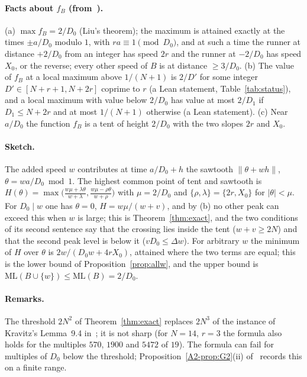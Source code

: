 \documentclass[11pt]{article}
\theoremstyle{definition}
\theoremstyle{remark}
\newcommand{\nd}[1]{\lVert #1\rVert}
\newcommand{\ML}{\mathrm{ML}}
\newcommand{\xB}[1]{\ref{A2-#1}}
\begin{document}
\paragraph{Facts about $f_B$ (from~\cite{A2}).}
(a) $\max f_B=2/D_0$ (Liu's theorem); the maximum is attained exactly at the times $\pm a/D_0$ modulo $1$, with $ra\equiv1\pmod{D_0}$, and at such a time the runner at distance $+2/D_0$ from an integer has speed $2r$ and the runner at $-2/D_0$ has speed $X_0$, or the reverse; every other speed of $B$ is at distance $\ge3/D_0$. (b) The value of $f_B$ at a local maximum above $1/(N+1)$ is $2/D'$ for some integer $D'\in[N+r+1,N+2r]$ coprime to $r$ (a Lean statement, Table~\ref{tab:status}), and a local maximum with value below $2/D_0$ has value at most $2/D_1$ if $D_1\le N+2r$ and at most $1/(N+1)$ otherwise (a Lean statement). (c) Near $a/D_0$ the function $f_B$ is a tent of height $2/D_0$ with the two slopes $2r$ and $X_0$.

\paragraph{Sketch.}
The added speed $w$ contributes at time $a/D_0+h$ the sawtooth $\nd{\theta+wh}$, $\theta=wa/D_0\bmod1$. The highest common point of tent and sawtooth is $H(\theta)=\max\bigl(\frac{w\mu+\lambda\theta}{w+\lambda},\frac{w\mu-\rho\theta}{w+\rho}\bigr)$ with $\mu=2/D_0$ and $\{\rho,\lambda\}=\{2r,X_0\}$ for $|\theta|<\mu$. For $D_0\mid w$ one has $\theta=0$, $H=w\mu/(w+v)$, and by (b) no other peak can exceed this when $w$ is large; this is Theorem~\ref{thm:exact}, and the two conditions of its second sentence say that the crossing lies inside the tent ($w+v\ge2N$) and that the second peak level is below it ($vD_0\le\Delta w$). For arbitrary $w$ the minimum of $H$ over $\theta$ is $2w/(D_0w+4rX_0)$, attained where the two terms are equal; this is the lower bound of Proposition~\ref{prop:allw}, and the upper bound is $\ML(B\cup\{w\})\le\ML(B)=2/D_0$.

\paragraph{Remarks.}
The threshold $2N^2$ of Theorem~\ref{thm:exact} replaces $2N^3$ of the instance of Kravitz's Lemma~9.4 in~\cite[Theorem~\xB{thm:DEL}(e)]{A2}; it is not sharp (for $N=14$, $r=3$ the formula also holds for the multiples $570$, $1900$ and $5472$ of $19$). The formula can fail for multiples of $D_0$ below the threshold; Proposition~\xB{prop:G2}(ii) of~\cite{A2} records this on a finite range.
\end{document}
